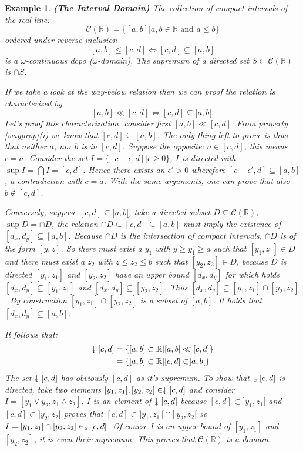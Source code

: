 \documentclass[a4paper,12pt]{article}
\newcommand{\downdownarrow}{\mathrel{\reflectbox{\rotatebox[origin=c]{90}{$\twoheadleftarrow$}}}}
\newtheorem{example}[theorem]{Example}
\newcommand{\R}{{\mathbb R}}
\begin{document}
\begin{example} \textbf{(The Interval Domain)}
The collection of compact intervals of the real line:
$$\mathcal{C}(\R) = \{[a, b] | a, b \in \R \text{ and } a \leq b \}$$
ordered under reverse inclusion
$$[a, b] \leq [c, d] \Leftrightarrow [c, d] \subseteq [a, b]$$
is a \emph{$\omega$-continuous} dcpo ($\omega$-domain). The supremum of a directed set $S \subset \mathcal{C}(\R)$ is $\cap S$.

If we take a look at the way-below relation then we can proof the relation is characterized by $$[a, b] \ll [c, d] \Leftrightarrow [c, d] \subseteq ]a, b[.$$ 
Let's proof this characterization, consider first $[a, b] \ll [c, d]$. From property \ref{wayprop}(i) we know that $[c, d] \subseteq [a, b]$. The only thing left to prove is thus that neither $a$, nor $b$ is in $[c, d]$. Suppose the opposite: $a \in [c,d]$, this means $c = a$. Consider the set $I = \{[c-\epsilon, d] | \epsilon \geq 0 \}$, $I$ is directed with $\sup I = \bigcap I = [c, d]$. Hence there exists an $\epsilon' > 0$ wherefore $[c-\epsilon', d] \subseteq [a, b]$, a contradiction with $c = a$. With the same arguments, one can prove that also $b \not\in [c,d]$.

Conversely, suppose $[c, d] \subseteq ]a, b[$, take a directed subset $D \subseteq \mathcal{C}(\R)$, $\sup D = \cap D$, the relation $\cap D \subseteq [c, d] \subseteq [a,b]$ must imply the existence of $[d_x, d_y] \subseteq [a, b]$. Because $\cap D$ is the intersection of compact intervals, $\cap D$ is of the form $[y, z]$. So there must exist a $y_1$ with $y \geq y_1 \geq a$ such that $[y_1, z_1] \in D$ and there must exist a $z_2$ with $z \leq z_2 \leq b$ such that $[y_2, z_2] \in D$, because $D$ is directed $[y_1, z_1]$ and $[y_2, z_2]$ have an upper bound $[d_x, d_y]$ for which holds $[d_x, d_y] \subseteq [y_1, z_1]$ and $[d_x, d_y] \subseteq [y_2, z_2]$. Thus $[d_x, d_y] \subseteq [y_1, z_1]\cap [y_2, z_2]$. By construction  $[y_1, z_1]\cap [y_2, z_2]$ is a subset of $[a,b]$. It holds that $[d_x, d_y] \subseteq [a,b]$.

It follows that:
\begin{eqnarray*}
\downdownarrow [c, d] &= \{ [a, b] \subset \R | [a, b] \ll [c, d]  \} \\
&= \{ [a, b] \subset \R | [c, d] \subset ]a, b[  \}
\end{eqnarray*}
The set $\downdownarrow [c, d]$ has obviously $[c,d]$ as it's supremum. To show that $\downdownarrow [c, d]$ is directed, take two elements $[y_1, z_1], [y_2, z_2] \in \downdownarrow [c, d]$ and consider $I = [y_1 \vee y_2, z_1 \wedge z_2]$, $I$ is an element of $\downdownarrow [c, d]$ because $[c, d] \subset ]y_1, z_1[$ and $[c, d] \subset ]y_2, z_2[$ proves that $[c, d] \subset ]y_1, z_1[ \cap ]y_2, z_2[$ so $I = [y_1, z_1] \cap [y_2, z_2] \in \downdownarrow [c,d]$. Of course $I$ is an upper bound of $[y_1, z_1]$ and $[y_2, z_2]$, it is even their supremum. This proves that $\mathcal{C}(\R)$ is a domain.
\end{example}
\end{document}
